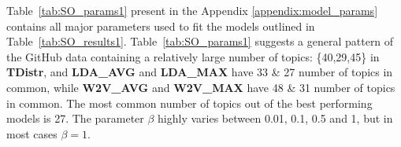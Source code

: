         Table~\ref{tab:SO_params1} present in the Appendix \ref{appendix:model_params} contains all major parameters used to fit the models outlined in Table~\ref{tab:SO_results1}. Table~\ref{tab:SO_params1} suggests a general pattern of the GitHub data containing a relatively large number of topics: \{40,29,45\} in  \textbf{TDistr}, and \textbf{LDA\_AVG} and \textbf{LDA\_MAX} have 33 \& 27 number of topics in common, while \textbf{W2V\_AVG} and \textbf{W2V\_MAX} have 48 \& 31 number of topics in common. The most common number of topics out of the best performing models is 27. The parameter $\beta$ highly varies between 0.01, 0.1, 0.5 and 1, but in most cases $\beta=1$.
        
        \begin{table}
          \centering
          \caption{Results of Experiment 2A - Expertise Extraction from GitHub Data}\label{tab:GH_results2}
            \vspace{6pt} %
        \end{table}
        
